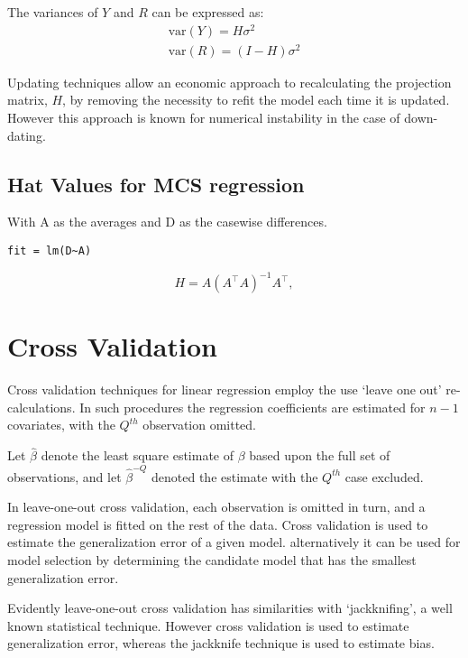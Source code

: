 The variances of $Y$ and $R$ can be expressed as:
\begin{eqnarray}
\mbox{var}(Y) = H\sigma^{2} \nonumber\\
\mbox{var}(R) = (I-H)\sigma^{2}
\end{eqnarray}

Updating techniques allow an economic approach to recalculating the projection matrix, $H$, by removing the necessity to refit the model each time it is updated. However this approach is known for
numerical instability in the case of down-dating.



\subsection{Hat Values for MCS regression}

With A as the averages and D as the casewise differences.
\begin{verbatim}
fit = lm(D~A)
\end{verbatim}

\begin{displaymath}
H = A \left(A^\top  A\right)^{-1} A^\top ,
\end{displaymath}

\newpage
\section{Cross Validation} %

Cross validation techniques for linear regression employ the use `leave one out' re-calculations. In such procedures the regression coefficients are estimated for $n-1$ covariates, with the $Q^{th}$ observation omitted.

Let $\hat{\beta}$ denote the least square estimate of $\beta$ based upon the full set of observations, and let
$\hat{\beta}^{-Q}$ denoted the estimate with the $Q^{th}$ case
excluded.


In leave-one-out cross validation, each observation is omitted in turn, and a regression model is fitted on the rest of the data. Cross validation is used to estimate the generalization error of a given model. alternatively it can be used for model selection by determining the candidate model that has the smallest generalization error.


Evidently leave-one-out cross validation has similarities with `jackknifing', a well known statistical technique. However cross validation is used to estimate generalization error, whereas the jackknife technique is used to estimate bias.

